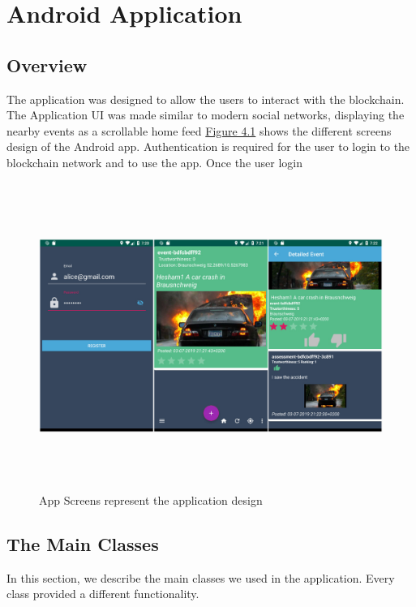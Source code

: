 \chapter{Android Application}
\section {Overview}
The application was designed to allow the users to interact with the blockchain. The Application UI was made similar to modern social networks, displaying the nearby events as a scrollable home feed \hyperref[fig:appscreens]{Figure 4.1} shows the different screens design of the Android app.  Authentication is required for the user to login to the blockchain network and to use the app. Once the user login
\ \\
 \begin{figure}[H]
\includegraphics[width=15cm,height=10cm]{images/appscreens.jpg}
\caption{App Screens represent the application design}
\label{fig:appscreens}
\end{figure}
 
\section{The Main Classes} 

In this section, we describe the main classes we used in the application. Every class provided a different functionality.
